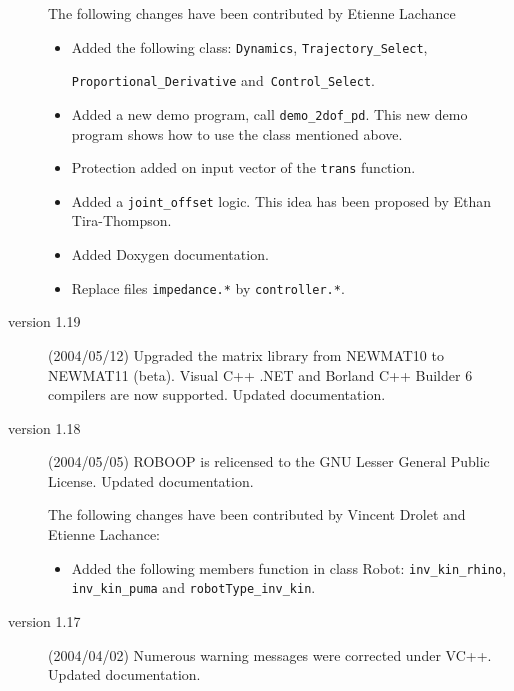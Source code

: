 \documentclass[11pt,fleqn,letterpaper]{report}
\begin{document}
\begin{description}
  The following changes have been contributed by Etienne Lachance

  \begin{itemize}
  \item Added the following class: \texttt{Dynamics},
    \texttt{Trajectory\_Select}, \par \texttt{Proportional\_Derivative}
    and\texttt{ Control\_Select}.
  \item Added a new demo program, call \texttt{demo\_2dof\_pd}. This
    new demo program shows how to use the class mentioned above.
  \item Protection added on input vector of the \texttt{trans}
    function.
  \item Added a \texttt{joint\_offset} logic. This idea has been
    proposed by Ethan Tira-Thompson.
  \item Added \textsf{Doxygen} documentation.
  \item Replace files \texttt{impedance.*} by \texttt{controller.*}.
  \end{itemize}


\item[version 1.19] (2004/05/12) Upgraded the matrix library from
  \textsf{NEWMAT10} to \textsf{NEWMAT11 (beta)}. \textsf{Visual C++
    .NET} and \textsf{Borland C++ Builder 6} compilers are now
  supported. Updated documentation.

\item[version 1.18] (2004/05/05) \textsf{ROBOOP} is relicensed to the
  GNU Lesser General Public License. Updated documentation.

  The following changes have been contributed by Vincent Drolet and
  Etienne Lachance:
  \begin{itemize}
  \item Added the following members function in class Robot:
    \texttt{inv\_kin\_rhino}, \texttt{inv\_kin\_puma} and
    \texttt{robotType\_inv\_kin}.
  \end{itemize}

\item[version 1.17] (2004/04/02) Numerous warning messages were
  corrected under \textsf{VC++}. Updated documentation.


\end{description}
\end{document}
